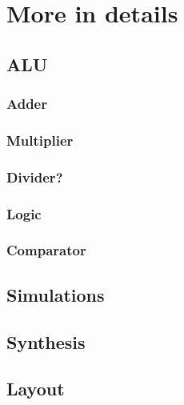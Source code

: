 
\chapter{More in details}
\label{chap3}

\section{ALU}
\subsection{Adder}
\subsection{Multiplier}
\subsection{Divider?}
\subsection{Logic}
\subsection{Comparator}

\section{Simulations}
\section{Synthesis}
\section{Layout}